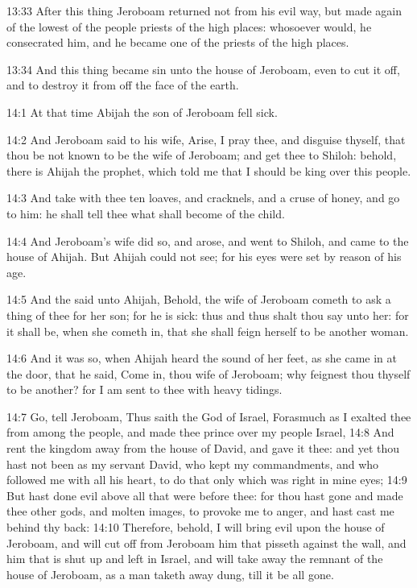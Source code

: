 13:33 After this thing Jeroboam returned not from his evil way, but made again of the lowest of the people priests of the high places: whosoever would, he consecrated him, and he became one of the priests of the high places.

13:34 And this thing became sin unto the house of Jeroboam, even to cut it off, and to destroy it from off the face of the earth.

14:1 At that time Abijah the son of Jeroboam fell sick.

14:2 And Jeroboam said to his wife, Arise, I pray thee, and disguise thyself, that thou be not known to be the wife of Jeroboam; and get thee to Shiloh: behold, there is Ahijah the prophet, which told me that I should be king over this people.

14:3 And take with thee ten loaves, and cracknels, and a cruse of honey, and go to him: he shall tell thee what shall become of the child.

14:4 And Jeroboam's wife did so, and arose, and went to Shiloh, and came to the house of Ahijah. But Ahijah could not see; for his eyes were set by reason of his age.

14:5 And the \LORD said unto Ahijah, Behold, the wife of Jeroboam cometh to ask a thing of thee for her son; for he is sick: thus and thus shalt thou say unto her: for it shall be, when she cometh in, that she shall feign herself to be another woman.

14:6 And it was so, when Ahijah heard the sound of her feet, as she came in at the door, that he said, Come in, thou wife of Jeroboam; why feignest thou thyself to be another? for I am sent to thee with heavy tidings.

14:7 Go, tell Jeroboam, Thus saith the \LORD God of Israel, Forasmuch as I exalted thee from among the people, and made thee prince over my people Israel, 14:8 And rent the kingdom away from the house of David, and gave it thee: and yet thou hast not been as my servant David, who kept my commandments, and who followed me with all his heart, to do that only which was right in mine eyes; 14:9 But hast done evil above all that were before thee: for thou hast gone and made thee other gods, and molten images, to provoke me to anger, and hast cast me behind thy back: 14:10 Therefore, behold, I will bring evil upon the house of Jeroboam, and will cut off from Jeroboam him that pisseth against the wall, and him that is shut up and left in Israel, and will take away the remnant of the house of Jeroboam, as a man taketh away dung, till it be all gone.

